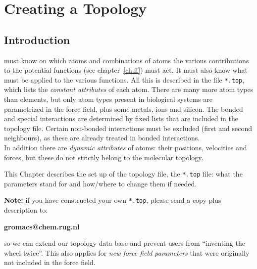 \chapter{Creating a Topology}
\label{ch:top}
\section{Introduction}
{\gromacs} must know on which atoms and combinations of atoms the
various contributions to the potential functions (see
chapter~\ref{ch:ff}) must act. It must  
also know what  must be applied to the various
functions. All this is described in the {\em {}} file
\verb'*.top', which lists the {\em constant attributes} of each atom.
There are many more atom
types than elements, but only atom types present in biological 
systems are parametrized in the force field, plus some metals, ions and 
silicon. The bonded and special interactions are determined by fixed
lists that are included in the topology file. Certain non-bonded
interactions must be excluded (first and second neighbours), as these
are already treated in bonded interactions.\\  
In addition there are {\em dynamic attributes} of atoms: their
positions, velocities and forces, but these do not strictly belong to
the molecular topology.  

This Chapter describes the set up of the topology file, the
\verb'*.top' file: what the parameters stand for and how/where to
change them if needed. 

{\bf Note:} if you have constructed your own \verb'*.top', please
send a copy plus description to:\\
\centerline{\bf gromacs@chem.rug.nl}

so we can extend our topology data base and prevent {\gromacs} users
from ``inventing the wheel twice''. This also applies for {\em new
force field parameters} that were originally not included in the
{\gromacs} force field.

